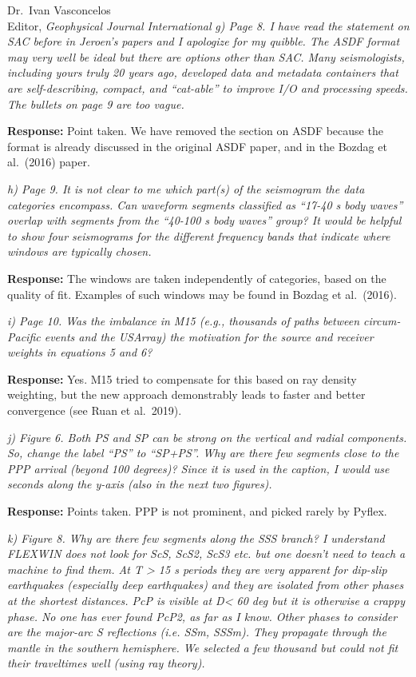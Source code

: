 \documentclass[11pt,a4paper]{letter}
\newcommand{\response}[1]{\textbf{Response:} #1}
\newcommand{\rev}[1]{{\it{#1}}}
\begin{document}
\begin{letter}{Dr.~Ivan Vasconcelos\\
Editor, \textit{Geophysical Journal International}}
\rev{g) Page 8. I have read the statement on SAC before in Jeroen's papers and I apologize for my quibble. The ASDF format may very well be ideal but there are options other than SAC. Many seismologists, including yours truly 20 years ago, developed data and metadata containers that are self-describing, compact, and ``cat-able'' to improve I/O and processing speeds. The bullets on page 9 are too vague.
}

\response{Point taken. We have removed the section on ASDF because the format is already discussed in the original ASDF paper, and in the Bozdag et al.~(2016) paper.}

\rev{h) Page 9. It is not clear to me which part(s) of the seismogram the data categories encompass. Can waveform segments classified as ``17-40 s body waves'' overlap with segments from the ``40-100 s body waves'' group? It would be helpful to show four seismograms for the different frequency bands that indicate where windows are typically chosen.
}

\response{The windows are taken independently of categories, based on the quality of fit. Examples of such windows may be found in Bozdag et al.~(2016).}

\rev{i) Page 10. Was the imbalance in M15 (e.g., thousands of paths between circum-Pacific events and the USArray) the motivation for the source and receiver weights in equations 5 and 6?
}

\response{Yes. M15 tried to compensate for this based on ray density weighting, but the new approach demonstrably leads to faster and better convergence (see Ruan et al.~2019).}

\rev{j) Figure 6. Both PS and SP can be strong on the vertical and radial components. So, change the label ``PS'' to ``SP+PS''. Why are there few segments close to the PPP arrival (beyond 100 degrees)? Since it is used in the caption, I would use seconds along the y-axis (also in the next two figures).
}

\response{Points taken. PPP is not prominent, and picked rarely by Pyflex.}

\rev{k) Figure 8. Why are there few segments along the SSS branch? I understand FLEXWIN does not look for ScS, ScS2, ScS3 etc. but one doesn't need to teach a machine to find them.
At T > 15 s periods they are very apparent for dip-slip earthquakes (especially deep earthquakes) and they are isolated from other phases at the shortest distances.
PcP is visible at D< 60 deg but it is otherwise a crappy phase. No one has ever found PcP2, as far as I know. Other phases to consider are the major-arc S reflections (i.e. SSm, SSSm). 
They propagate through the mantle in the southern hemisphere. We selected a few thousand but could not fit their traveltimes well (using ray theory).
}


\end{letter}
\end{document}

